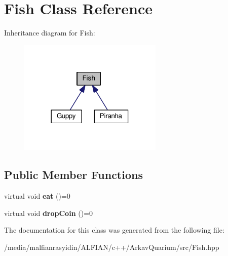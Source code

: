 \hypertarget{class_fish}{}\section{Fish Class Reference}
\label{class_fish}


Inheritance diagram for Fish\+:
\nopagebreak
\begin{figure}[H]
\begin{center}
\leavevmode
\includegraphics[width=194pt]{class_fish__inherit__graph}
\end{center}
\end{figure}
\subsection*{Public Member Functions}
\begin{DoxyCompactItemize}
\item 
\mbox{\label{class_fish_af209980bd39b8de9b4bb38b7ad4edd04}} 
virtual void {\bfseries eat} ()=0
\item 
\mbox{\label{class_fish_a899c7712639756297b9205e8bbcc2cf6}} 
virtual void {\bfseries drop\+Coin} ()=0
\end{DoxyCompactItemize}


The documentation for this class was generated from the following file\+:\begin{DoxyCompactItemize}
\item 
/media/malfianrasyidin/\+A\+L\+F\+I\+A\+N/c++/\+Arkav\+Quarium/src/Fish.\+hpp\end{DoxyCompactItemize}
